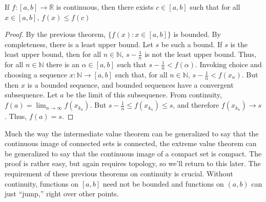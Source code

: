             \begin{theorem}
                If $f:[a,b]\rightarrow\mathbb{R}$ is
                continuous, then there exists $c\in[a,b]$
                such that for all $x\in[a,b]$,
                $f(x)\leq{f(c)}$
            \end{theorem}
            \begin{proof}
                By the previous theorem,
                $\{f(x):x\in[a,b]\}$ is bounded.
                By completeness, there is a least upper
                bound. Let $s$ be such
                a bound. If $s$ is the least upper bound,
                then for all $n\in\mathbb{N}$, $s-\frac{1}{n}$
                is not the least upper bound. Thus, for
                all $n\in\mathbb{N}$ there is an $\alpha\in[a,b]$
                such that
                $s-\frac{1}{n}<f(\alpha)$. Invoking choice and
                choosing a sequence $x:\mathbb{N}\rightarrow[a,b]$ such
                that, for all $n\in\mathbb{N}$, $s-\frac{1}{n}<f(x_{n})$.
                But then $x$
                is a bounded sequence, and bounded
                sequences have a convergent subsequence.
                Let $a$ be the limit of this subsequence.
                From continuity,
                $f(a)=\lim_{n\rightarrow\infty}f(x_{k_{n}})$.
                But $s-\frac{1}{n}\leq{f(x_{k_{n}})}\leq{s}$,
                and therefore $f(x_{k_{n}})\rightarrow{s}$.
                Thus, $f(a)=s$.
            \end{proof}
            Much the way the intermediate value theorem can be
            generalized to say that the continuous image of
            connected sets is connected, the extreme value
            theorem can be generalized to say that the
            continuous image of a compact set is compact.
            The proof is rather easy, but again
            requires topology, so we'll return to this later.
            The requirement of these previous theorems on
            continuity is crucial. Without continuity, functions
            on $[a,b]$ need not be bounded and functions on
            $(a,b)$ can just ``jump,'' right over other points.
